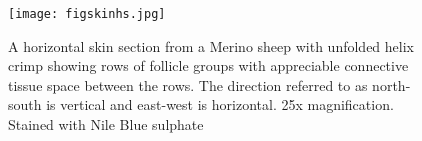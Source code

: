 %

\begin{figure}[!h]
  \centering
  \texttt{[image: figskinhs.jpg]}
  \caption{A horizontal skin section from a Merino sheep with unfolded helix crimp showing rows of follicle groups with appreciable connective tissue space between the rows. The direction referred to as north-south is vertical and east-west is horizontal. 25x magnification. Stained with Nile Blue sulphate}
  \label{skin:hs}
\end{figure}

%

